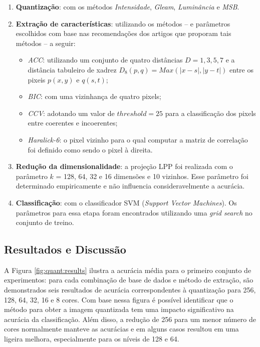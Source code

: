 \begin{enumerate}
\item \textbf{Quantização}: com os métodos \emph{Intensidade}, \emph{Gleam}, \emph{Luminância} e \emph{MSB}.
\item \textbf{Extração de características}: utilizando os métodos -- e parâmetros escolhidos com base nas recomendações dos artigos que proporam tais métodos -- a seguir:
  \begin{itemize}
    \item \emph{ACC}: utilizando um conjunto de quatro distâncias $D = {1, 3, 5, 7}$ e a distância tabuleiro de xadrez $D_8(p,q) = Max(|x-s|, |y-t|)$ entre os pixeis $p(x,y)$ e $q(s,t)$;
    \item \emph{BIC}: com uma vizinhança de quatro pixels;
    \item \emph{CCV}: adotando um valor de $\mathit{threshold} = 25$ para a classificação dos pixels entre coerentes e incoerentes;
    \item \emph{Haralick-6}: o pixel vizinho para o qual computar a matriz de correlação foi definido como sendo o pixel à direita.
  \end{itemize}
\item \textbf{Redução da dimensionalidade}: a projeção LPP foi realizada com o parâmetro $k$ = 128, 64, 32 e 16 dimensões e 10 vizinhos. Esse parâmetro foi determinado empiricamente e não influencia consideravelmente a acurácia.
\item \textbf{Classificação}: com o classificador SVM (\textit{Support Vector Machines}). Os parâmetros para essa etapa foram encontrados utilizando uma \textit{grid search} no conjunto de treino.
\end{enumerate}

\subsection{Resultados e Discussão}

A Figura \ref{fig:quant:results} ilustra a acurácia média para o primeiro conjunto de experimentos: para cada combinação de base de dados e método de extração, são demonstrados seis resultados de acurácia correspondentes à quantização para 256, 128, 64, 32, 16 e 8 cores. Com base nessa figura é possível identificar que o método para obter a imagem quantizada tem uma impacto significativo na acurácia da classificação. Além disso, a redução de 256 para um menor número de cores normalmente manteve as acurácias e em alguns casos resultou em uma ligeira melhora, especialmente para os níveis de 128 e 64.

